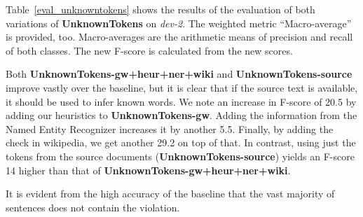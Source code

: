 \documentclass[a4paper,10pt]{scrartcl}
\theoremstyle{style}
\begin{document}
Table~\ref{eval_unknowntokens} shows the results of the evaluation of both variations of \textbf{UnknownTokens} on \textit{dev-2}. The weighted metric ``Macro-average'' is provided, too.
Macro-averages are the arithmetic means of precision and recall of both classes. The new F-score is calculated from the new scores.

Both \textbf{UnknownTokens-gw+heur+ner+wiki} and \textbf{UnknownTokens-source} improve vastly over the baseline, but it is clear that if the source text is available, it should be used to infer known words. We note an increase in F-score of 20.5 by adding our heuristics to \textbf{UnknownTokens-gw}. Adding the information from the Named Entity Recognizer increases it by another 5.5. Finally, by adding the check in wikipedia, we get another 29.2 on top of that.
In contrast, using just the tokens from the source documents (\textbf{UnknownTokens-source}) yields an F-score 14 higher than that of \textbf{UnknownTokens-gw+heur+ner+wiki}.

It is evident from the high accuracy of the baseline that the vast majority of sentences does not contain the violation.
\end{document}
